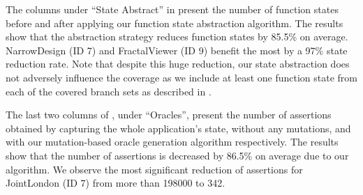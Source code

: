 The columns under ``State Abstract'' in  present the number of function states
before and after applying our function state abstraction algorithm.   
The results show that the abstraction strategy reduces function states by 85.5\% on average. NarrowDesign (ID 7) and FractalViewer (ID 9) benefit the most by a 97\% state reduction rate. 
Note that despite this huge reduction, our state abstraction does not adversely influence the coverage as we include at least one function state from each of the covered branch sets as described in .

The last two columns of , under ``Oracles'', present the number of assertions obtained by capturing the whole application's state,  without any mutations, and with our mutation-based oracle generation algorithm respectively. The results show that the number of assertions is decreased by 86.5\% on average due to 
our algorithm. 
We observe the most significant reduction of assertions for JointLondon (ID 7) from more than 198000 to 342. 





